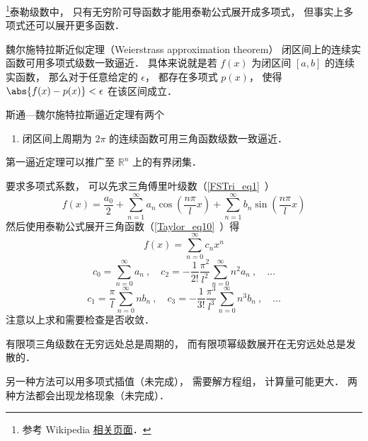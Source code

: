 \begin{issues}
\issueDraft
\end{issues}


\footnote{参考 Wikipedia \href{https://en.wikipedia.org/wiki/Stone–Weierstrass theorem}{相关页面}．}泰勒级数中， 只有无穷阶可导函数才能用泰勒公式展开成多项式， 但事实上多项式还可以展开更多函数．

\begin{theorem}{魏尔施特拉斯近似定理（Weierstrass approximation theorem）}
闭区间上的连续实函数可用多项式级数一致逼近． 具体来说就是若 $f(x)$ 为闭区间 $[a, b]$ 的连续实函数， 那么对于任意给定的 $\epsilon$， 都存在多项式 $p(x)$， 使得 $\abs{f(x) - p(x)} < \epsilon$ 在该区间成立．
\end{theorem}


\begin{theorem}
斯通—魏尔施特拉斯逼近定理有两个
\begin{enumerate}
\item 闭区间上周期为 $2\pi$ 的连续函数可用三角函数级数一致逼近．
\end{enumerate}
第一逼近定理可以推广至 $\mathbb {R}^{n}$ 上的有界闭集．
\end{theorem}

要求多项式系数， 可以先求三角傅里叶级数（\autoref{FSTri_eq1}~）
\begin{equation}
f(x) = \frac{a_0}{2} + \sum_{n = 1}^\infty a_n \cos (\frac{n\pi}{l}x) + \sum_{n = 1}^\infty b_n \sin (\frac{n\pi}{l}x)
\end{equation}
然后使用泰勒公式展开三角函数（\autoref{Taylor_eq10}~）得
\begin{equation}
f(x) = \sum_{n=0}^\infty c_n x^n
\end{equation}
\begin{equation}
c_0 = \sum_{n=0}^\infty a_n~,
\quad
c_2 = -\frac{1}{2!}\frac{\pi^2}{l^2} \sum_{n=0}^\infty n^2 a_n~, \quad \dots
\end{equation}
\begin{equation}
c_1 = \frac{\pi}{l} \sum_{n=0}^\infty n b_n~,
\quad
c_3 = -\frac{1}{3!}\frac{\pi^3}{l^3} \sum_{n=0}^\infty n^3 b_n~, \quad \dots
\end{equation}
注意以上求和需要检查是否收敛．

有限项三角级数在无穷远处总是周期的， 而有限项幂级数展开在无穷远处总是发散的．

另一种方法可以用多项式插值（未完成）， 需要解方程组， 计算量可能更大． 两种方法都会出现龙格现象（未完成）．

